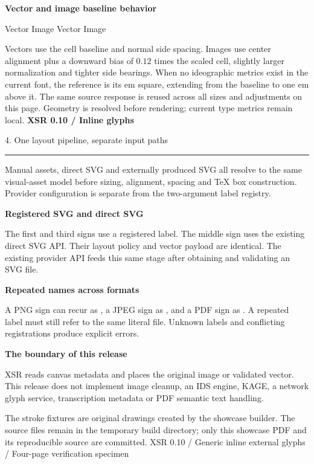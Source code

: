 \documentclass[11pt,a4paper]{article}
\newcommand\PageTitle[1]{{\color{ink}\LARGE\bfseries XSR 0.10 / Inline glyphs}\par
 {\color{accent}\large #1}\par\medskip\hrule\medskip}
\begin{document}
\textbf{Vector and image baseline behavior}

Vector \quad Image \quad
Vector \quad Image 

Vectors use the cell baseline and normal side spacing. Images use center
alignment plus a downward bias of $0.12$ times the scaled cell, slightly larger
normalization and tighter side bearings.
When no ideographic metrics exist in the current font, the reference is its
em square, extending from the baseline to one em above it.
\vfill
\small The same source response is reused across all sizes and adjustments on
this page. Geometry is resolved before rendering; current type metrics remain local.
\newpage
\PageTitle{4. One layout pipeline, separate input paths}
Manual assets, direct SVG and externally produced SVG all resolve to the same
visual-asset model before sizing, alignment, spacing and TeX box construction.
Provider configuration is separate from the two-argument label registry.

\textbf{Registered SVG and direct SVG}

{\fontsize{26}{36}\selectfont
{}\quad{}\quad{}\par}

The first and third signs use a registered label. The middle sign uses the
existing direct SVG API. Their layout policy and vector payload are identical.
The existing provider API feeds this same stage after obtaining and validating
an SVG file.

\textbf{Repeated names across formats}

A PNG sign  can recur as , a JPEG sign
 as , and a PDF sign  as .
A repeated label must still refer to the same literal file. Unknown labels and
conflicting registrations produce explicit errors.

\textbf{The boundary of this release}

XSR reads canvas metadata and places the original image or validated vector.
This release does not implement image cleanup, an IDS engine, KAGE, a network
glyph service, transcription metadata or PDF semantic text handling.

The stroke fixtures are original drawings created by the showcase builder.
The source files remain in the temporary build directory; only this showcase
PDF and its reproducible source are committed.
\vfill
\small XSR 0.10 / Generic inline external glyphs / Four-page verification specimen
\end{document}
